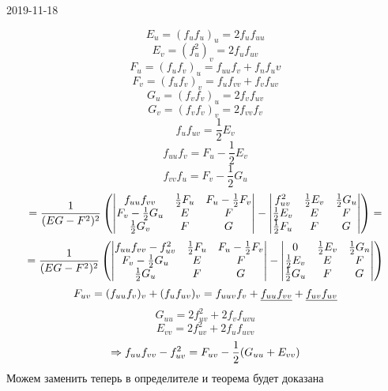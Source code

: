 \documentclass[main]{subfiles}
\begin{document}
\begin{lect}{2019-11-18}
\begin{Proof}[теоремы]
      \[E_u = (f_u f_u)_u = 2 f_u f_{uu}\]
      \[E_v = (f_u^2)_v = 2 f_u f_{uv}\]
      \[F_u = (f_u f_v)_u = f_{uu}f_v + f_n f_uv\]
      \[F_v = (f_u f_v)_v = f_u f_{vv} + f_v f_{uv}\]
      \[G_u = (f_v f_v)_u = 2 f_v f_{uv}\]
      \[G_v = (f_v f_v)_v = 2 f_{vv} f_v\]
      \[f_u f_{uv} = \frac{1}{2} E_v\]
      \[f_{uu} f_v = F_u - \frac{1}{2} E_v\]
      \[f_{vv} f_u = F_v - \frac{1}{2} G_u\]
      \[ = \frac{1}{(EG - F^2)^2} \left(\begin{vmatrix}
          f_{uu} f_{vv} & \frac{1}{2} F_u & F_u - \frac{1}{2} F_v\\
          F_v - \frac{1}{2} G_u & E & F\\
          \frac{1}{2} G_v & F & G
        \end{vmatrix} - \begin{vmatrix}
            f_{uv}^2 & \frac{1}{2}E_v & \frac{1}{2} G_u\\
            \frac{1}{2}E_v & E & F\\
            \frac{1}{2}F_u & F & G
          \end{vmatrix}\right) =
      \]
      \[ = \frac{1}{(EG - F^2)^2} \left(\begin{vmatrix}
          f_{uu} f_{vv} - f_{uv}^2 & \frac{1}{2} F_u & F_u - \frac{1}{2} F_v\\
          F_v - \frac{1}{2} G_u & E & F\\
          \frac{1}{2} G_u & F & G
        \end{vmatrix} - \begin{vmatrix}
          0 & \frac{1}{2}E_v & \frac{1}{2} G_n\\
          \frac{1}{2}E_v & E & F\\
          \frac{1}{2}G_u & F & G
        \end{vmatrix}\right)
      \]
      \[F_{uv} = (f_{uu} f_v)_v + (f_u f_{uv})_v = f_{uuv} f_v + \underline{f_{uu}f_{vv}} + \underline{f_{uv}f_{uv}}\]
      \[G_{uu} = 2 f_{uv}^2 + 2 f_v f_{uvu}\]
      \[E_{vv} = 2 f_{uv}^2 + 2 f_u f_{uvv}\]
      \[\Rightarrow f_{uu} f_{vv} - f^2_{uv} = F_{uv} - \frac{1}{2}(G_{uu}+E_{vv})\]
      Можем заменить теперь в определителе и теорема будет доказана
    \end{Proof}


\end{lect}
\end{document}
